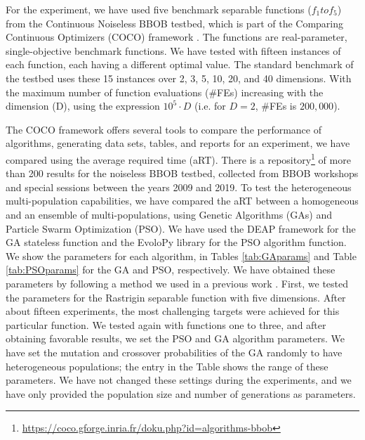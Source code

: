 For the experiment, we have used five benchmark separable functions ($f_1 to f_5 $)
from the Continuous Noiseless BBOB testbed, which is part of the Comparing
Continuous Optimizers (COCO) framework \cite{hansen2016coco}. The functions are
real-parameter, single-objective benchmark functions. We have tested with fifteen
instances of each function, each having a different optimal value. The standard
benchmark of the testbed uses these 15 instances over 2, 3, 5, 10, 20, and 40
dimensions. With the maximum number of function evaluations (\#FEs) increasing
with the dimension (D), using the expression $10^5 \cdot D$ (i.e. for $D = 2$,
\#FEs is $200,000$).

The COCO framework offers several tools to compare the performance of
algorithms, generating data sets, tables, and reports for an experiment, we have
compared using the average required time (aRT). There is a
repository\footnote{\url{https://coco.gforge.inria.fr/doku.php?id=algorithms-bbob}}
of more than 200 results for the noiseless BBOB testbed, collected from BBOB
workshops and special sessions between the years 2009 and 2019. To test the
heterogeneous multi-population capabilities, we have compared the aRT between a
homogeneous and an ensemble of multi-populations, using Genetic Algorithms
(GAs) and Particle Swarm Optimization (PSO). We have used the DEAP framework for the
GA stateless function \cite{fortin2012deap} and the EvoloPy library
\cite{faris2016evolopy} for the PSO algorithm function. We show the parameters
for each algorithm, in Tables \ref{tab:GAparams} and Table \ref{tab:PSOparams}
for the GA and PSO, respectively. We have obtained these parameters by following a
method we used in a previous work \cite{garcia2017benchmarking}. First, we
tested the parameters for the Rastrigin separable function with five
dimensions. After about fifteen experiments, the most challenging targets were
achieved for this particular function. We tested again with functions one to
three, and after obtaining favorable results, we set the PSO and GA algorithm
parameters. We have set the mutation and crossover probabilities of the GA randomly
to have heterogeneous populations; the entry in the Table shows the range of these
parameters. We have not changed these settings during the experiments, and we have
only provided the population size and number of generations as parameters.

